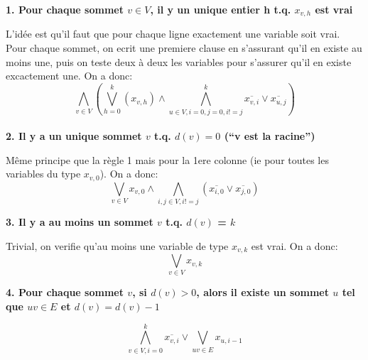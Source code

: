 \documentclass[12pt,a4paper]{article}
\begin{document}
\textbf{1. Pour chaque sommet $v \in V$, il y un unique entier h t.q. $x_{v,h}$ est vrai}

L'idée est qu'il faut que pour chaque ligne exactement une variable soit vrai. Pour chaque sommet, on ecrit une premiere clause en s'assurant qu'il en existe au moins une, puis on teste deux à deux les variables pour s'assurer qu'il en existe excactement une. On a donc:
\[
\bigwedge_{v \in V}( \bigvee_{h = 0}^{k} (x_{v,h}) \wedge \bigwedge_{u \in V, i=0, j=0, i!=j}^{k} \overline{x_{v,i}} \vee \overline{x_{u,j}})
\]
\\

\textbf{2. Il y a un unique sommet $v$ t.q. $d(v) = 0$ (``v est la racine'')}

Même principe que la règle 1 mais pour la 1ere colonne (ie pour toutes les variables du type $x_{v,0}$). On a donc:
\[
\bigvee_{v \in V} x_{v,0} \wedge \bigwedge_{i,j \in V, i!=j} (\overline{x_{i,0}} \vee \overline{x_{j,0}})
\]

\textbf{3. Il y a au moins un sommet $v$ t.q. $d(v)$ = $k$}

Trivial, on verifie qu'au moins une variable de type $x_{v,k}$ est vrai. On a donc:
\[
\bigvee_{v \in V}x_{v,k}
\]

 
\textbf{4. Pour chaque sommet $v$, si $d(v) > 0$, alors il existe un sommet $u$ tel que $uv \in E$ et $d(v) = d(v) - 1$}

\[
\bigwedge_{v \in V, i=0}^{k} \overline{x_{v,i}} \vee \bigvee_{uv \in E} x_{u,i-1}
\]
\end{document}
